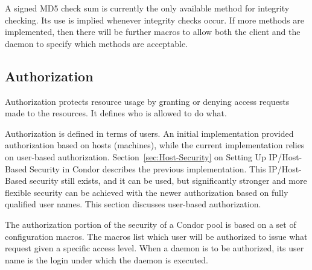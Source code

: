 A signed MD5 check sum is currently the only available method
for integrity checking.
Its use is implied whenever integrity checks occur.
If more methods are implemented, then there will be further
macros to allow both the client and the daemon to specify
which methods are acceptable.

\subsection{\label{sec:Security-Authorization}Authorization}

Authorization protects resource usage by granting or denying
access requests made to the resources.
It defines who is allowed to do what.

Authorization is defined in terms of users.
An initial implementation provided authorization
based on hosts (machines), while the current implementation
relies on user-based authorization.
Section~\ref{sec:Host-Security}
on Setting Up IP/Host-Based Security in Condor describes the
previous implementation.
This IP/Host-Based security still exists, and it can be used,
but significantly stronger and more flexible
security can be achieved with the newer
authorization based on fully qualified user names.
This section discusses user-based authorization. 


The authorization portion of the security of a Condor pool is
based on a set of configuration macros.
The macros list which user will be authorized
to issue what request given a specific access level.
When a daemon is to be authorized, its user name is the 
login under which the daemon is executed.

